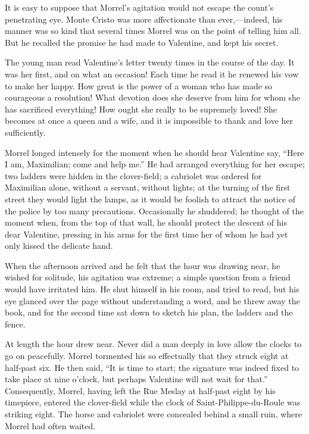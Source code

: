 It is easy to suppose that Morrel’s agitation would not escape the
count’s penetrating eye. Monte Cristo was more affectionate than
ever,—indeed, his manner was so kind that several times Morrel was on
the point of telling him all. But he recalled the promise he had made
to Valentine, and kept his secret.

The young man read Valentine’s letter twenty times in the course of the
day. It was her first, and on what an occasion! Each time he read it he
renewed his vow to make her happy. How great is the power of a woman
who has made so courageous a resolution! What devotion does she deserve
from him for whom she has sacrificed everything! How ought she really
to be supremely loved! She becomes at once a queen and a wife, and it
is impossible to thank and love her sufficiently.

Morrel longed intensely for the moment when he should hear Valentine
say, “Here I am, Maximilian; come and help me.” He had arranged
everything for her escape; two ladders were hidden in the clover-field;
a cabriolet was ordered for Maximilian alone, without a servant,
without lights; at the turning of the first street they would light the
lamps, as it would be foolish to attract the notice of the police by
too many precautions. Occasionally he shuddered; he thought of the
moment when, from the top of that wall, he should protect the descent
of his dear Valentine, pressing in his arms for the first time her of
whom he had yet only kissed the delicate hand.

When the afternoon arrived and he felt that the hour was drawing near,
he wished for solitude, his agitation was extreme; a simple question
from a friend would have irritated him. He shut himself in his room,
and tried to read, but his eye glanced over the page without
understanding a word, and he threw away the book, and for the second
time sat down to sketch his plan, the ladders and the fence.

At length the hour drew near. Never did a man deeply in love allow the
clocks to go on peacefully. Morrel tormented his so effectually that
they struck eight at half-past six. He then said, “It is time to start;
the signature was indeed fixed to take place at nine o’clock, but
perhaps Valentine will not wait for that.” Consequently, Morrel, having
left the Rue Meslay at half-past eight by his timepiece, entered the
clover-field while the clock of Saint-Philippe-du-Roule was striking
eight. The horse and cabriolet were concealed behind a small ruin,
where Morrel had often waited.

